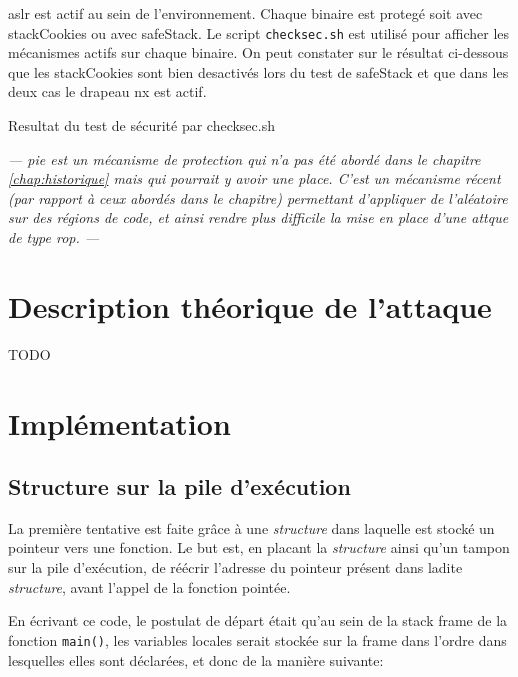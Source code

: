 \gls{aslr} est actif au sein de l'environnement. Chaque binaire est protegé soit avec \gls{stackCookies} ou avec \gls{safeStack}. Le script \texttt{checksec.sh} \cite{CheckSec} est utilisé pour afficher les mécanismes actifs sur chaque binaire. On peut constater sur le résultat ci-dessous que les \gls{stackCookies} sont bien desactivés lors du test de \gls{safeStack} et que dans les deux cas le drapeau \gls{nx} est actif.

\begin{listing}
	\caption{Resultat du test de sécurité par checksec.sh}
	\label{lst:checksecRes}
\end{listing}

\textit{--- \gls{pie} est un mécanisme de protection qui n'a pas été abordé dans le chapitre \ref{chap:historique} mais qui pourrait y avoir une place. C'est un mécanisme récent (par rapport à ceux abordés dans le chapitre) permettant d'appliquer de l'aléatoire sur des régions de code, et ainsi rendre plus difficile la mise en place d'une attque de type \gls{rop}. ---}

\section{Description théorique de l'attaque}


TODO

\section{Implémentation}

\subsection{Structure sur la pile d'exécution}

La première tentative est faite grâce à une \textit{structure} dans laquelle est stocké un pointeur vers une fonction. Le but est, en placant la \textit{structure} ainsi qu'un tampon sur la pile d'exécution, de réécrir l'adresse du pointeur présent dans ladite \textit{structure}, avant l'appel de la fonction pointée.

En écrivant ce code, le postulat de départ était qu'au sein de la \og stack frame \fg de la fonction \texttt{main()}, les variables locales serait stockée sur la frame dans l'ordre dans lesquelles elles sont déclarées, et donc de la manière suivante:

